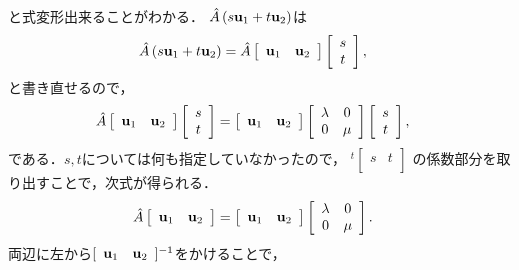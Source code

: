 %
と式変形出来ることがわかる．
%
$\hat{A}\left(s{\bf u}_{1}+t{\bf u}_2\right)$は
\begin{align}
\hat{A}\left(s{\bf u}_{1}+t{\bf u}_{2}\right) & =\hat{A}\left[\begin{array}{cc}
{\bf u}_{1} & {\bf u}_{2}\end{array}\right]\left[\begin{array}{c}
s\\
t
\end{array}\right], 
\end{align}
%
と書き直せるので，
\begin{align}
\hat{A}\left[\begin{array}{cc}
{\bf u}_{1} & {\bf u}_{2}\end{array}\right] & \left[\begin{array}{c}
s\\
t
\end{array}\right]=\left[\begin{array}{cc}
{\bf u}_{1} & {\bf u}_{2}\end{array}\right]\left[\begin{array}{cc}
\lambda & 0\\
0 & \mu
\end{array}\right]\left[
\begin{array}{c}
s\\
t
\end{array}
\right],
\end{align}
である．$s,t$については何も指定していなかったので，
${}^{t}[
\begin{array}{cc}
s & t \\
\end{array}
]$
%
の係数部分を取り出すことで，次式が得られる．
%
\begin{align}
\hat{A}\left[\begin{array}{cc}
{\bf u}_{1} & {\bf u}_{2}\end{array}\right] & =\left[\begin{array}{cc}
{\bf u}_{1} & {\bf u}_{2}\end{array}\right]\left[\begin{array}{cc}
\lambda & 0\\
0 & \mu
\end{array}\right]. 
\end{align}
%
両辺に左から$[
\begin{array}{cc}
{\bf u}_{1} & {\bf u}_{2} \\
\end{array}
]^{-1}$をかけることで，
